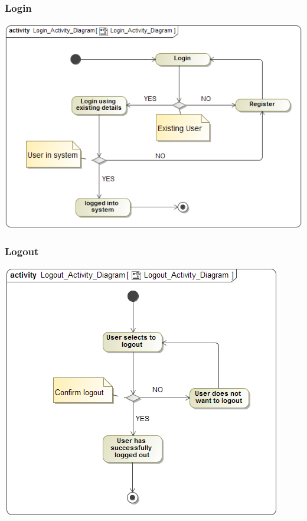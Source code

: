\documentclass[11pt]{article}
\begin{document}
	\newpage
	\subsubsection{Login}
	\begin{center}
		\includegraphics[width=\textwidth]{../Images/Login_Activity_Diagram.png}\\[0.5cm]
	\end{center}
	
	\newpage
	\subsubsection{Logout}
	\begin{center}
		\includegraphics[width=\textwidth]{../Images/Logout_Activity_Diagram.png}\\[0.5cm]
	\end{center}
	
\end{document}
